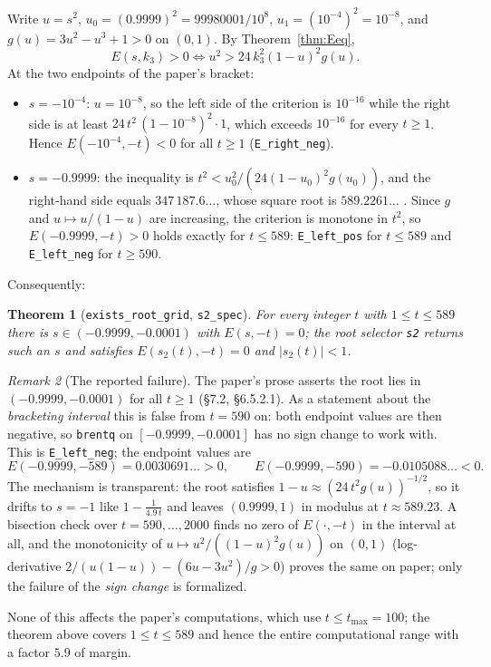 \documentclass[11pt,a4paper]{article}
\newcommand{\lb}{\_\allowbreak}
\newcommand{\code}[1]{\texttt{#1}}
\newcommand{\itemization}[1]{\begin{itemize}[leftmargin=1.4em,itemsep=1pt,topsep=2pt]#1\end{itemize}}
\newtheorem{theorem}{Theorem}[section]
\theoremstyle{definition}
\theoremstyle{remark}
\newtheorem{remark}[theorem]{Remark}
\begin{document}
Write $u=s^2$, $u_0=(0.9999)^2=99980001/10^8$, $u_1=(10^{-4})^2=10^{-8}$, and
$g(u)=3u^2-u^3+1>0$ on $(0,1)$.  By Theorem~\ref{thm:Eeq},
\[
  E(s,k_3)>0 \iff u^2>24\,k_3^2(1-u)^2 g(u).
\]
At the two endpoints of the paper's bracket:
\itemization{
\item $s=-10^{-4}$: $u=10^{-8}$, so the left side of the criterion is $10^{-16}$ while the
  right side is at least $24\,t^2\,(1-10^{-8})^2\cdot 1$, which exceeds $10^{-16}$ for every
  $t\ge1$.  Hence $E(-10^{-4},-t)<0$ for all $t\ge1$ (\code{E\lb right\lb neg}).
\item $s=-0.9999$: the inequality is $t^2 < u_0^2/(24(1-u_0)^2g(u_0))$, and the right-hand
  side equals $347\,187.6\ldots$, whose square root is $589.2261\ldots$ .  Since $g$ and
  $u\mapsto u/(1-u)$ are increasing, the criterion is monotone in $t^2$, so
  $E(-0.9999,-t)>0$ holds exactly for $t\le589$: \code{E\lb left\lb pos} for $t\le589$
  and \code{E\lb left\lb neg} for $t\ge590$.
}
Consequently:

\begin{theorem}[\code{exists\lb root\lb grid}, \code{s2\lb spec}]
For every integer $t$ with $1\le t\le589$ there is $s\in(-0.9999,-0.0001)$ with
$E(s,-t)=0$; the root selector \code{s2} returns such an $s$ and satisfies
$E(s_2(t),-t)=0$ and $|s_2(t)|<1$.
\end{theorem}

\begin{remark}[The reported failure]\label{rem:failure}
The paper's prose asserts the root lies in $(-0.9999,-0.0001)$ for all $t\ge1$
(\S7.2, \S6.5.2.1).  As a statement about the \emph{bracketing interval} this is false from
$t=590$ on: both endpoint values are then negative, so \code{brentq} on
$[-0.9999,-0.0001]$ has no sign change to work with.  This is
\code{E\lb left\lb neg}; the endpoint values are
\[
  E(-0.9999,-589)=0.0030691\ldots>0,\qquad E(-0.9999,-590)=-0.0105088\ldots<0 .
\]
The mechanism is transparent: the root satisfies $1-u\approx(24\,t^2g(u))^{-1/2}$, so it
drifts to $s=-1$ like $1-\frac{1}{4.9\,t}$ and leaves $(0.9999,1)$ in modulus at
$t\approx589.23$.  A bisection check over $t=590,\dots,2000$ finds no zero of
$E(\cdot,-t)$ in the interval at all, and the monotonicity of $u\mapsto u^2/((1-u)^2g(u))$
on $(0,1)$ (log-derivative $2/(u(1-u))-(6u-3u^2)/g>0$) proves the same on paper; only the
failure of the \emph{sign change} is formalized.

None of this affects the paper's computations, which use $t\le t_{\max}=100$; the theorem
above covers $1\le t\le589$ and hence the entire computational range with a factor $5.9$ of
margin.
\end{remark}
\end{document}
